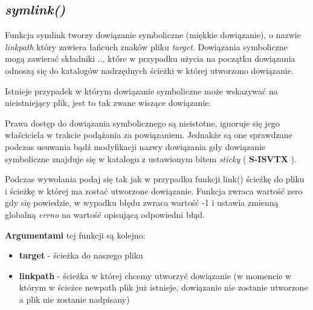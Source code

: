 \documentclass{article}
\begin{document}
\subsection{\textit{symlink()}}

Funkcja symlink tworzy dowiązanie symboliczne (miękkie dowiązanie), o nazwie \textit{linkpath} który zawiera łańcuch znaków pliku \textit{target}. Dowiązania symboliczne mogą zawierać składniki .., które w przypadku użycia na początku dowiązania odnoszą się do katalogów nadrzędnych ścieżki w której utworzono dowiązanie.

Istnieje przypadek w którym dowiązanie symboliczne może wskazywać na nieistniejący plik, jest to tak zwane wiszące dowiązanie.

Prawa dostęp do dowiązania symbolicznego są nieistotne, ignoruje się jego właściciela w trakcie podążania za powiązaniem. Jednakże są one sprawdzane podczas usuwania bądź modyfikacji nazwy dowiązania gdy dowiązanie symboliczne znajduje się w katalogu z ustawionym bitem \textit{sticky} ( \textbf{S-ISVTX} ).

Podczas wywołania podaj się tak jak w przypadku funkcji link() ścieżkę do pliku i ścieżkę w której ma zostać utworzone dowiązanie.
Funkcja zwraca wartość zero gdy się powiedzie, w wypadku błędu zwraca wartość -1 i ustawia zmienną globalną \textit{errno} na wartość opisującą odpowiedni błąd.

\textbf{Argumentami} tej funkcji są kolejno:
\begin{itemize}
\item \textbf{target} - ścieżka do naszego pliku
\item \textbf{linkpath} - ścieżka w której chcemy utworzyć dowiązanie (w momencie w którym w ścieżce newpath plik już istnieje, dowiązanie nie zostanie utworzone a plik nie zostanie nadpisany)
\end{itemize}
\end{document}
